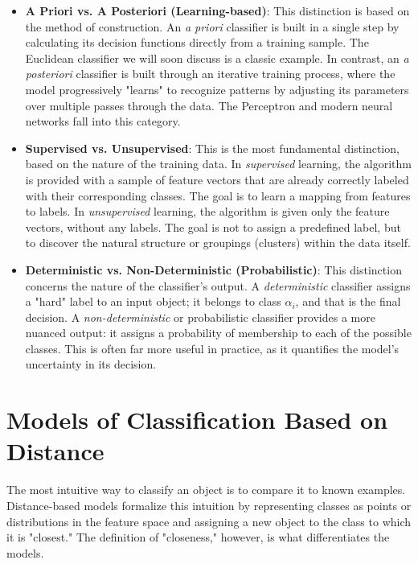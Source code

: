 \begin{itemize}
    \item \textbf{A Priori vs. A Posteriori (Learning-based)}: This distinction is based on the method of construction. An \textit{a priori} classifier is built in a single step by calculating its decision functions directly from a training sample. The Euclidean classifier we will soon discuss is a classic example. In contrast, an \textit{a posteriori} classifier is built through an iterative training process, where the model progressively "learns" to recognize patterns by adjusting its parameters over multiple passes through the data. The Perceptron and modern neural networks fall into this category.
    
    \item \textbf{Supervised vs. Unsupervised}: This is the most fundamental distinction, based on the nature of the training data. In \textit{supervised} learning, the algorithm is provided with a sample of feature vectors that are already correctly labeled with their corresponding classes. The goal is to learn a mapping from features to labels. In \textit{unsupervised} learning, the algorithm is given only the feature vectors, without any labels. The goal is not to assign a predefined label, but to discover the natural structure or groupings (clusters) within the data itself.
    
    \item \textbf{Deterministic vs. Non-Deterministic (Probabilistic)}: This distinction concerns the nature of the classifier's output. A \textit{deterministic} classifier assigns a "hard" label to an input object; it belongs to class $\alpha_i$, and that is the final decision. A \textit{non-deterministic} or probabilistic classifier provides a more nuanced output: it assigns a probability of membership to each of the possible classes. This is often far more useful in practice, as it quantifies the model's uncertainty in its decision.
\end{itemize}

\section{Models of Classification Based on Distance}
\label{sec:distance_classifiers}
The most intuitive way to classify an object is to compare it to known examples. Distance-based models formalize this intuition by representing classes as points or distributions in the feature space and assigning a new object to the class to which it is "closest." The definition of "closeness," however, is what differentiates the models.

